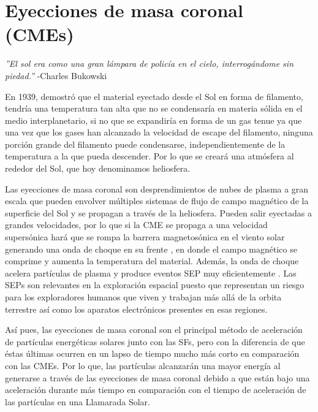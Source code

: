 \chapter{Eyecciones de masa coronal (CMEs)}

\begin{flushright}
\textit{''El sol era como una gran lámpara de policía en el cielo, interrogándome sin piedad.''}
-Charles Bukowski
\end{flushright}


En 1939, \textcite[][]{lyman-1939} demostró que el material eyectado desde el Sol en forma de filamento, tendría una temperatura tan alta que no se condensaría en materia sólida en el medio interplanetario, si no que se expandiría en forma de un gas tenue ya que una vez que los gases han alcanzado la velocidad de escape del filamento, ninguna porción grande del filamento puede condensarse, independientemente de la temperatura a la que pueda descender. Por lo que se creará una atmósfera al rededor del Sol, que hoy denominamos heliosfera.

Las eyecciones de masa coronal son desprendimientos de nubes de plasma a gran escala que pueden envolver múltiples sistemas de flujo de campo magnético de la superficie del Sol y se propagan a través de la heliosfera. Pueden salir eyectadas a grandes velocidades, por lo que si la CME se propaga a una velocidad supersónica hará que se rompa la barrera magnetosónica en el viento solar generando una onda de choque en su frente \parencite[e.g.,][]{gosling-1976, sonett-1964, gosling-1993}, en donde el campo magnético se comprime y aumenta la temperatura del material. Además, la onda de choque acelera partículas de plasma y produce eventos \ac{SEP} muy eficientemente \parencite[e.g.,][]{kahler-1978, kahler-1983, mewaldt-2007}. Las SEPs son relevantes en la exploración espacial puesto que representan un riesgo para los exploradores humanos que viven y trabajan más allá de la orbita terrestre así como los aparatos electrónicos presentes en esas regiones.

Así pues, las eyecciones de masa coronal son el principal método de aceleración de partículas energéticas solares junto con las \acp{SF}, pero con la diferencia de que éstas últimas ocurren en un lapso de tiempo mucho más corto en comparación con las \acp{CME}. Por lo que, las partículas alcanzarán una mayor energía al generarse a través de las eyecciones de masa coronal debido a que están bajo una aceleración durante más tiempo en comparación con el tiempo de aceleración de las partículas en una Llamarada Solar.

